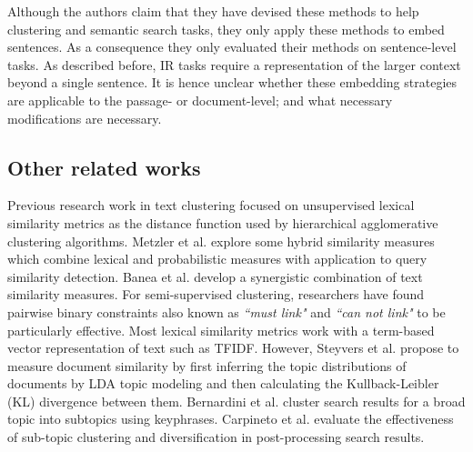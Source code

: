 Although the authors claim that they have devised these methods to help clustering and semantic search tasks, they only apply these methods to embed sentences. As a consequence they  only evaluated their methods on sentence-level tasks. As described before, IR tasks require a representation of the larger context beyond a single sentence. It is hence unclear whether these embedding strategies are applicable to the  passage- or document-level;  and what necessary modifications are necessary.

\subsection{Other related works} Previous research work in text clustering\cite{kulis2009semi,bilenko2004integrating,davidson2008finding,basu2004probabilistic,basu2002semi,gomaa2013survey} focused on unsupervised lexical similarity metrics as the distance function used by hierarchical agglomerative clustering algorithms. Metzler et al.\cite{metzler2007similarity} explore some hybrid similarity measures which combine lexical and probabilistic measures with application to query similarity detection. Banea et al.\cite{banea2012unt} develop a synergistic combination of text similarity measures. For semi-supervised clustering, researchers have found pairwise binary constraints also known as \textit{``must link"} and \textit{``can not link"} to be particularly effective. Most lexical similarity metrics work with a term-based vector representation of text such as TFIDF. However, Steyvers et al.\cite{steyvers2007probabilistic} propose to measure document similarity by first inferring the topic distributions of documents by LDA\cite{blei2003latent} topic modeling and then calculating the Kullback-Leibler (KL) divergence between them. Bernardini et al. \cite{bernardini2009full} cluster search results for a broad topic into subtopics using keyphrases. Carpineto et al. \cite{carpineto2012evaluating} evaluate the effectiveness of sub-topic clustering and diversification in post-processing search results.


